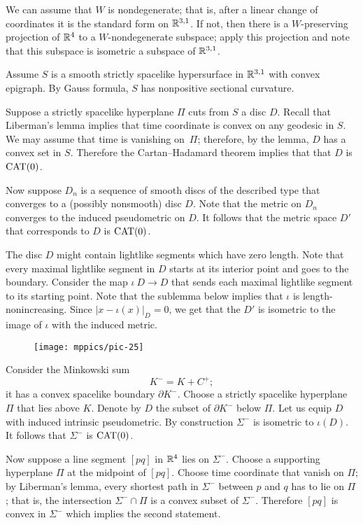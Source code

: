 \documentclass{article}
\begin{document}
We can assume that $W$ is nondegenerate; that is, after a linear change of coordinates it is the standard form on $\mathbb{R}^{3,1}$.
If not, then there is a $W$-preserving projection of $\mathbb{R}^4$ to a $W$-nondegenerate subspace; apply this projection and note that this subspace is isometric a subspace of $\mathbb{R}^{3,1}$.

Assume $S$ is a smooth strictly spacelike hypersurface in $\mathbb{R}^{3,1}$ with convex epigraph.
By Gauss formula, $S$ has nonpositive sectional curvature.

Suppose a strictly spacelike hyperplane $\Pi$ cuts from $S$ a disc $D$.
Recall that Liberman's lemma \cite[Theorem~3]{milka} implies that time coordinate is convex on any geodesic in $S$.
We may assume that time is vanishing on~$\Pi$;
therefore, by the lemma, $D$ has a convex set in $S$.
Therefore the Cartan--Hadamard theorem \cite{alexander-kapovitch-petrunin-2021} implies that that $D$ is $\mathrm{CAT}(0)$.

Now suppose $D_n$ is a sequence of smooth discs of the described type that converges to a (possibly nonsmooth) disc $D$.
Note that the metric on $D_n$ converges to the induced pseudometric on $D$.
It follows that the metric space $D'$ that corresponds to $D$ is $\mathrm{CAT}(0)$.

The disc $D$ might contain lightlike segments which have zero length.
Note that every maximal lightlike segment in $D$ starts at its interior point and goes to the boundary.
Consider the map $\iota\:D\to D$ that sends each maximal lightlike segment to its starting point.
Note that the sublemma below implies that $\iota$ is length-nonincreasing.
Since $|x-\iota(x)|_D=0$, we get that the $D'$ is isometric to the image of $\iota$ with the induced metric.

\begin{wrapfigure}{r}{61mm}
\vskip-0mm
\centering
\texttt{[image: mppics/pic-25]}
\end{wrapfigure}

Consider the Minkowski sum
\[K^-=K+C^+;\]
it has a convex spacelike boundary $\partial K^-$.
Choose a strictly spacelike hyperplane $\Pi$ that lies above $K$.
Denote by $D$ the subset of $\partial K^-$ below $\Pi$.
Let us equip $D$ with induced intrinsic pseudometric.
By construction $\Sigma^-$ is isometric to $\iota(D)$.
It follows that $\Sigma^-$ is $\mathrm{CAT}(0)$. 

Now suppose a line segment $[pq]$ in $\mathbb{R}^4$ 
lies on $\Sigma^-$.
Choose a supporting hyperplane $\Pi$ at the midpoint of $[pq]$.
Choose time coordinate that vanish on $\Pi$;
by Liberman's lemma, every shortest path in $\Sigma^-$ between $p$ and $q$ has to lie on $\Pi$;
that is, the intersection $\Sigma^-\cap \Pi$ is a convex subset of $\Sigma^-$.
Therefore $[pq]$ is convex in $\Sigma^-$ which implies the second statement.
\qeds
\end{document}

